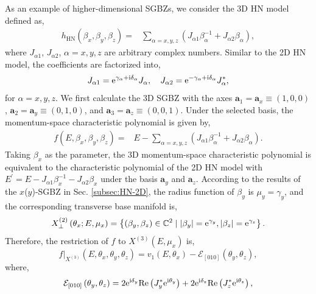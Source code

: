 \documentclass[pdflatex,sn-nature, iicol]{sn-jnl}%
\theoremstyle{thmstyleone}%
\theoremstyle{thmstyletwo}%
\theoremstyle{thmstylethree}%
\begin{document}
As an example of higher-dimensional SGBZs, we consider the 3D HN model
defined as, 
\begin{align}
h_{\text{HN}}\left(\beta_{x},\beta_{y},\beta_{z}\right)= & \sum_{\alpha=x,y,z}\left(J_{\alpha1}\beta_{\alpha}^{-1}+J_{\alpha2}\beta_{\alpha}\right),
\end{align}
where $J_{\alpha1}$, $J_{\alpha2}$, $\alpha=x,y,z$ are arbitrary
complex numbers. Similar to the 2D HN model, the coefficients are
factorized into, 
\begin{equation}
J_{\alpha1}=\mathrm{e}^{\gamma_{\alpha}+\mathrm{i}\delta_{\alpha}}J_{\alpha},\quad J_{\alpha2}=\mathrm{e}^{-\gamma_{\alpha}+\mathrm{i}\delta_{\alpha}}J_{\alpha}^{*},
\end{equation}
for $\alpha=x,y,z$. We first calculate the 3D SGBZ with the axes
$\mathbf{a}_{1}=\mathbf{a}_{x}\equiv(1,0,0)$, $\mathbf{a}_{2}=\mathbf{a}_{y}\equiv(0,1,0)$,
and $\mathbf{a}_{3}=\mathbf{a}_{z}\equiv(0,0,1)$. Under the selected
basis, the momentum-space characteristic polynomial is given by, 
\begin{align}
f\left(E,\beta_{x},\beta_{y},\beta_{z}\right)= & E-\sum_{\alpha=x,y,z}\left(J_{\alpha1}\beta_{\alpha}^{-1}+J_{\alpha2}\beta_{\alpha}\right).
\end{align}
Taking $\beta_{x}$ as the parameter, the 3D momentum-space characteristic
polynomial is equivalent to the characteristic polynomial of the 2D
HN model with $E^{\prime}=E-J_{\alpha1}\beta_{x}^{-1}-J_{\alpha2}\beta_{x}$
under the basis $\mathbf{a}_{y}$ and $\mathbf{a}_{z}$. According
to the results of the $x$($y$)-SGBZ in Sec. \ref{subsec:HN-2D},
the radius function of $\beta_{y}$ is $\mu_{y}=\gamma_{y}$, and
the corresponding transverse base manifold is, 
\begin{equation}
X_{\perp}^{(2)}\left(\theta_{x};E,\mu_{x}\right)=\left\{ \left(\beta_{y},\beta_{z}\right)\in\mathbb{C}^{2}\mid\left|\beta_{y}\right|=\mathrm{e}^{\gamma_{y}},\left|\beta_{z}\right|=\mathrm{e}^{\gamma_{z}}\right\} .
\end{equation}
Therefore, the restriction of $f$ to $X^{(3)}(E,\mu_{x})$ is, 
\begin{equation}
f|_{X^{(3)}}\left(E,\theta_{x},\theta_{y},\theta_{z}\right)=v_{1}\left(E,\theta_{x}\right)-\mathcal{E}_{[010]}\left(\theta_{y},\theta_{z}\right),\label{eq:3D-ChP-1}
\end{equation}
where, 
\begin{equation}
\mathcal{E}_{[010]}\left(\theta_{y},\theta_{z}\right)=2\mathrm{e}^{\mathrm{i}\delta_{y}}\text{Re}\left(J_{y}^{*}\mathrm{e}^{\mathrm{i}\theta_{y}}\right)+2\mathrm{e}^{\mathrm{i}\delta_{z}}\text{Re}\left(J_{z}^{*}\mathrm{e}^{\mathrm{i}\theta_{z}}\right),
\end{equation}
\end{document}
